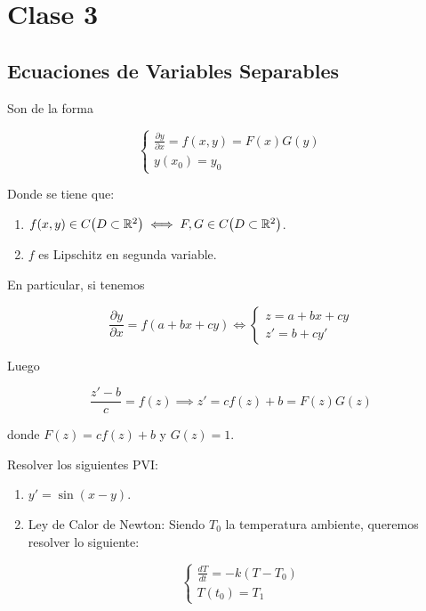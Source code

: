 \section*{Clase 3}
\subsection*{Ecuaciones de Variables Separables}

Son de la forma

\[
    \begin{cases*}
        \frac{\partial y}{\partial x} = f(x, y) = F(x)G(y) \\
        y(x_0) = y_0
    \end{cases*}
\]

Donde se tiene que:

\begin{enumerate}
    \item $f(x, y) \in C\big( D \subset \mathbb{R}^2 \big) \iff F, G \in C\big( D \subset \mathbb{R}^2 \big)$.
    \item $f$ es Lipschitz en segunda variable.
\end{enumerate}

En particular, si tenemos

\[
    \frac{\partial y}{\partial x} = f(a + bx + cy) \iff \begin{cases*}
                                            z = a + bx + cy \\
                                            z' = b + cy'
                                        \end{cases*}
\]

Luego

\[
    \frac{z' - b}{c} = f(z) \implies z' = cf(z) + b = F(z)G(z)
\]

donde $F(z) = cf(z) + b$ y $G(z) = 1$.


\begin{ejem}
    Resolver los siguientes PVI:

    \begin{enumerate}
        \item $y' = \sin(x-y)$.
        \item Ley de Calor de Newton: Siendo $T_0$ la temperatura ambiente, queremos resolver lo siguiente:
        
        \[
            \begin{cases*}
                \frac{dT}{dt} = -k(T - T_0) \\
                T(t_0) = T_1
            \end{cases*}  
        \]
    \end{enumerate}
\end{ejem}

